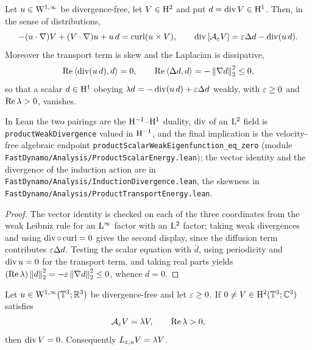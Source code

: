 \begin{lemma}
  \label{lem:finish:divergence-energy}
  \leanok
  Let $u\in\mathrm{W}^{1,\infty}$ be divergence-free, let $V\in\mathrm{H}^2$ and put $d=\operatorname{div} V\in\mathrm{H}^1$.  Then, in
  the sense of distributions,
  \[
    -(u\cdot\nabla)V+(V\cdot\nabla)u+u\,d=\operatorname{curl}(u\times V),
    \qquad
    \operatorname{div}\left[\mathcal{A}_\varepsilon V\right]=\varepsilon\Delta d-\operatorname{div}(u\,d).
  \]
  Moreover the transport term is skew and the Laplacian is dissipative,
  \[
    \operatorname{Re}\left\langle\operatorname{div}(u\,d),d\right\rangle=0,
    \qquad
    \operatorname{Re}\left\langle\Delta d,d\right\rangle=-\left\|\nabla d\right\|_2^2\leq0,
  \]
  so that a scalar $d\in\mathrm{H}^1$ obeying $\lambda d=-\operatorname{div}(u\,d)+\varepsilon\Delta d$ weakly, with
  $\varepsilon\geq0$ and $\operatorname{Re}\lambda>0$, vanishes.
\end{lemma}

In Lean the two pairings are the $\mathrm{H}^{-1}$--$\mathrm{H}^1$ duality, $\operatorname{div}$ of an $\mathrm{L}^2$ field is
\texttt{productWeakDivergence} valued in $\mathrm{H}^{-1}$, and the final implication is the
velocity-free algebraic endpoint \texttt{productScalarWeakEigenfunction\_eq\_zero} (module
\texttt{FastDynamo/Analysis/ProductScalarEnergy.lean}); the vector identity and the divergence of
the induction action are in \texttt{FastDynamo/Analysis/InductionDivergence.lean}, the skewness in
\texttt{FastDynamo/Analysis/ProductTransportEnergy.lean}.

\begin{proof}
  \leanok
  The vector identity is checked on each of the three coordinates from the weak Leibniz rule for an
  $\mathrm{L}^\infty$ factor with an $\mathrm{L}^2$ factor; taking weak divergences and using
  $\operatorname{div}\circ\operatorname{curl}=0$ gives the second display, since the diffusion term contributes
  $\varepsilon\Delta d$.  Testing the scalar equation with $\bar d$, using periodicity and $\operatorname{div} u=0$ for
  the transport term, and taking real parts yields
  $(\operatorname{Re}\lambda)\left\|d\right\|_2^2=-\varepsilon\left\|\nabla d\right\|_2^2\leq0$, whence $d=0$.
\end{proof}

\begin{lemma}
  \label{lem:positive-eigenfunction-solenoidal}
  \leanok
  Let $u\in\mathrm{W}^{1,\infty}(\mathbb{T}^3;\mathbb{R}^3)$ be divergence-free and let $\varepsilon\geq0$.  If
  $0\neq V\in\mathrm{H}^2(\mathbb{T}^3;\mathbb{C}^3)$ satisfies
  \[
    \mathcal{A}_\varepsilon V=\lambda V,
    \qquad\operatorname{Re}\lambda>0,
  \]
  then $\operatorname{div} V=0$.  Consequently $L_{\varepsilon,u}V=\lambda V$.
\end{lemma}

